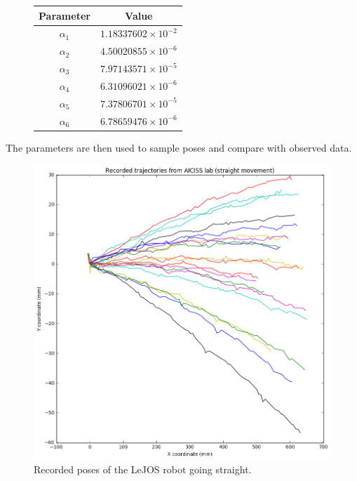\documentclass[paper=a4, fontsize=11pt]{scrartcl} %
\begin{document}
    
    \begin{figure}[h!]
        \centering
        \def\arraystretch{1.5}
        \begin{tabular}{|c|c|}
            \hline
            Parameter & Value \\
            \hline
            $\alpha_1$ & $1.18337602\times 10 ^{-2}$ \\
            $\alpha_2$ & $4.50020855\times 10 ^{-6}$ \\
            $\alpha_3$ & $7.97143571\times 10 ^{-5}$ \\
            $\alpha_4$ & $6.31096021\times 10 ^{-6}$ \\
            $\alpha_5$ & $7.37806701\times 10 ^{-5}$ \\
            $\alpha_6$ & $6.78659476\times 10 ^{-6}$ \\
            \hline
        \end{tabular}
    \end{figure}

    The parameters are then used to sample poses and compare with observed data.

    \begin{figure}[h!]
        \begin{center}
            \setlength{\fboxsep}{0.5pt} %
            \setlength{\fboxrule}{0.5pt}
            \includegraphics[width=12cm,fbox]{images/recorded_poses_straight.png}
            \caption{Recorded poses of the LeJOS robot going straight.}
        \end{center}
    \end{figure}
\end{document}
